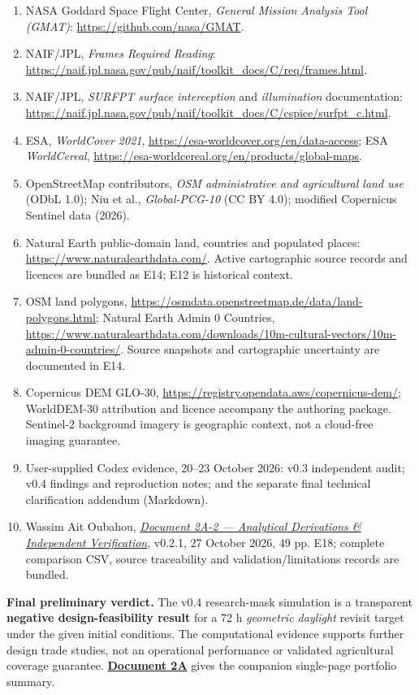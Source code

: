 \documentclass[10pt,a4paper]{article}
\begin{document}
{\fontsize{8.5}{10}\selectfont
\begin{enumerate}[leftmargin=*,itemsep=1pt]
\item NASA Goddard Space Flight Center, \emph{General Mission Analysis Tool (GMAT)}: \url{https://github.com/nasa/GMAT}.
\item NAIF/JPL, \emph{Frames Required Reading}: \url{https://naif.jpl.nasa.gov/pub/naif/toolkit_docs/C/req/frames.html}.
\item NAIF/JPL, \emph{SURFPT surface interception} and \emph{illumination} documentation: \url{https://naif.jpl.nasa.gov/pub/naif/toolkit_docs/C/cspice/surfpt_c.html}.
\item ESA, \emph{WorldCover 2021}, \url{https://esa-worldcover.org/en/data-access}; ESA \emph{WorldCereal}, \url{https://esa-worldcereal.org/en/products/global-maps}.
\item OpenStreetMap contributors, \emph{OSM administrative and agricultural land use} (ODbL 1.0); Niu et al., \emph{Global-PCG-10} (CC BY 4.0); modified Copernicus Sentinel data (2026).
\item Natural Earth public-domain land, countries and populated places: \url{https://www.naturalearthdata.com/}. Active cartographic source records and licences are bundled as E14; E12 is historical context.
\item OSM land polygons, \url{https://osmdata.openstreetmap.de/data/land-polygons.html}; Natural Earth Admin 0 Countries, \url{https://www.naturalearthdata.com/downloads/10m-cultural-vectors/10m-admin-0-countries/}. Source snapshots and cartographic uncertainty are documented in E14.
\item Copernicus DEM GLO-30, \url{https://registry.opendata.aws/copernicus-dem/}; WorldDEM-30 attribution and licence accompany the authoring package. Sentinel-2 background imagery is geographic context, not a cloud-free imaging guarantee.
\item User-supplied Codex evidence, 20--23 October 2026: v0.3 independent audit; v0.4 findings and reproduction notes; and the separate final technical clarification addendum (Markdown).
\item Wassim Ait Oubahou, \href{AtlasSAT_2A-2_Analytical_Derivations_v0.2.1_Public_RC_v0_2.pdf}{\emph{Document 2A-2 --- Analytical Derivations \& Independent Verification}}, v0.2.1, 27 October 2026, 49 pp. E18; complete comparison CSV, source traceability and validation/limitations records are bundled.

\end{enumerate}}

\begin{infobox}[nobreak=true]
\textbf{Final preliminary verdict.} The v0.4 research-mask simulation is a transparent \textbf{negative design-feasibility result} for a 72 h \emph{geometric daylight} revisit target under the given initial conditions. The computational evidence supports further design trade studies, not an operational performance or validated agricultural coverage guarantee. \href{./AtlasSAT_2A_Orbital_Analysis_OnePager_RevD3_4_Public_RC_v0_2.pdf}{\textbf{Document 2A}} gives the companion single-page portfolio summary.
\end{infobox}
\end{document}
